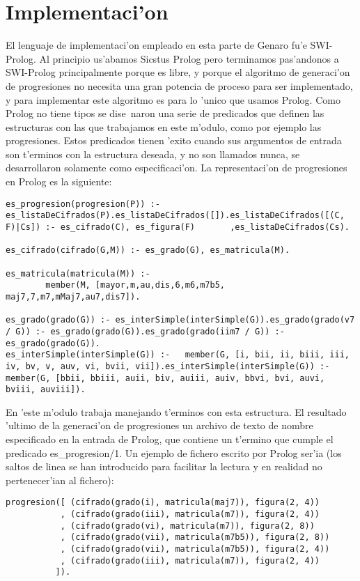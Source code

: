 \section {Implementaci'on}
El lenguaje de implementaci'on empleado en esta parte de Genaro fu'e SWI-Prolog. Al principio us'abamos Sicstus Prolog pero terminamos pas'andonos a SWI-Prolog principalmente porque es libre, y porque el algoritmo de generaci'on de progresiones no necesita una gran potencia de proceso para ser implementado, y para implementar este algoritmo es para lo 'unico que usamos Prolog.
\newline
Como Prolog no tiene tipos se dise~naron una serie de predicados que definen las estructuras con las que trabajamos en este m'odulo, como por ejemplo las progresiones. Estos predicados tienen 'exito cuando sus argumentos de entrada son t'erminos con la estructura deseada, y no son llamados nunca, se desarrollaron solamente como especificaci'on.
\newline
La representaci'on de progresiones en Prolog es la siguiente:
        \begin{verbatim}
es_progresion(progresion(P)) :- es_listaDeCifrados(P).es_listaDeCifrados([]).es_listaDeCifrados([(C, F)|Cs]) :- es_cifrado(C), es_figura(F)       ,es_listaDeCifrados(Cs).

es_cifrado(cifrado(G,M)) :- es_grado(G), es_matricula(M).

es_matricula(matricula(M)) :- 
        member(M, [mayor,m,au,dis,6,m6,m7b5, maj7,7,m7,mMaj7,au7,dis7]).

es_grado(grado(G)) :- es_interSimple(interSimple(G)).es_grado(grado(v7 / G)) :- es_grado(grado(G)).es_grado(grado(iim7 / G)) :- es_grado(grado(G)).
es_interSimple(interSimple(G)) :-	member(G, [i, bii, ii, biii, iii, iv, bv, v, auv, vi, bvii, vii]).es_interSimple(interSimple(G)) :-	member(G, [bbii, bbiii, auii, biv, auiii, auiv, bbvi, bvi, auvi, bviii, auviii]).
        \end{verbatim}
En 'este m'odulo trabaja manejando t'erminos con esta estructura. El resultado 'ultimo de la generaci'on de progresiones un archivo de texto de nombre especificado en la entrada de Prolog, que contiene un t'ermino que cumple el predicado es\_progresion/1. Un ejemplo de fichero escrito por Prolog ser'ia (los saltos de linea se han introducido para facilitar la lectura y en realidad no pertenecer'ian al fichero):
        \begin{verbatim}
progresion([ (cifrado(grado(i), matricula(maj7)), figura(2, 4))
           , (cifrado(grado(iii), matricula(m7)), figura(2, 4))
           , (cifrado(grado(vi), matricula(m7)), figura(2, 8))
           , (cifrado(grado(vii), matricula(m7b5)), figura(2, 8))
           , (cifrado(grado(vii), matricula(m7b5)), figura(2, 4))
           , (cifrado(grado(iii), matricula(m7)), figura(2, 4))
          ]).
        \end{verbatim}

